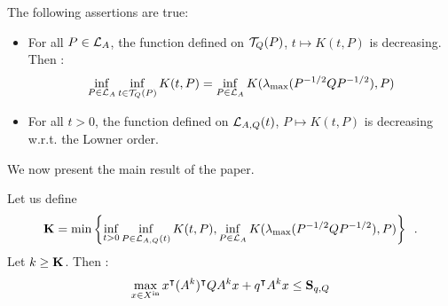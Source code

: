 \documentclass[10pt]{article}
\begin{document}
\begin{prop}
The following assertions are true:
\begin{itemize}
\item For all $P\in\mathcal{L}_{A}$, the function defined on $\mathcal{T}_{Q}(P)$, $t\mapsto K(t,P)$ is decreasing. Then : 
\[
\inf_{P\in\mathcal{L}_{A}} \inf_{t\in\mathcal{T}_{Q}(P)} K(t,P)=\inf_{P\in\mathcal{L}_{A}}K(\lambda_{\operatorname{max}}(P^{-1/2} Q P^{-1/2}),P)
\]
\item For all $t>0$, the function defined on $\mathcal{L}_{A,Q}(t)$, $P\mapsto K(t,P)$ is decreasing w.r.t. the Lowner order.
\end{itemize}
\end{prop}

We now present the main result of the paper. %

\begin{theorem}
\label{thfond}
Let us define \[\mathbf{K}=\min\left\{\inf_{t>0}\inf_{P\in\mathcal{L}_{A,Q}(t)} K(t,P),\inf_{P\in\mathcal{L}_{A}} K(\lambda_{\operatorname{max}}(P^{-1/2}QP^{-1/2}),P)\right\}\enspace .\] Let $k\geq \mathbf{K}$. Then : 
\[
\max_{x\in X^\mathrm{in}} x^\intercal (A^k)^\intercal Q A^k x+q^\intercal A^k x\leq \mathbf{S}_{q,Q}
\]
\end{theorem}
\end{document}
